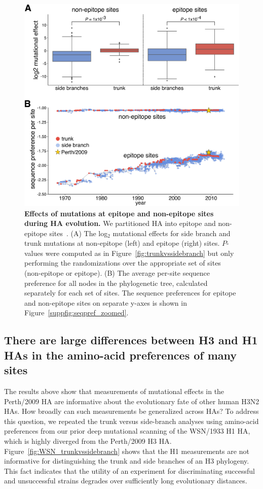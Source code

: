 \documentclass[9pt,twocolumn,twoside]{pnas-new}
\begin{document}
\begin{figure}
\centering
\includegraphics[width=\columnwidth]{figs/sequence_preference/sequence_preference.pdf}
\caption{\label{fig:sequence_preference}
{\bf Effects of mutations at epitope and non-epitope sites during HA evolution.}
We partitioned HA into epitope and non-epitope sites~\cite{wolf2006long}.
(A) The log$_{2}$ mutational effects for side branch and trunk mutations at non-epitope (left) and epitope (right) sites.
$P$-values were computed as in Figure~\ref{fig:trunkvssidebranch} but only performing the randomizations over the appropriate set of sites (non-epitope or epitope).
(B) 
The average per-site sequence preference for all nodes in the phylogenetic tree, calculated separately for each set of sites.
The sequence preferences for epitope and non-epitope sites on separate y-axes is shown in Figure~\ref{suppfig:seqpref_zoomed}.
}
\end{figure}


\subsection*{There are large differences between H3 and H1 HAs in the amino-acid preferences of many sites}
The results above show that measurements of mutational effects in the Perth/2009 HA are informative about the evolutionary fate of other human H3N2 HAs.
How broadly can such measurements be generalized across HAs?
To address this question, we repeated the trunk versus side-branch analyses using amino-acid preferences from our prior deep mutational scanning of the WSN/1933 H1 HA, which is highly diverged from the Perth/2009 H3 HA.
Figure~\ref{fig:WSN_trunkvssidebranch} shows that the H1 measurements are not informative for distinguishing the trunk and side branches of an H3 phylogeny.
This fact indicates that the utility of an experiment for discriminating successful and unsuccessful strains degrades over sufficiently long evolutionary distances. 
\end{document}
